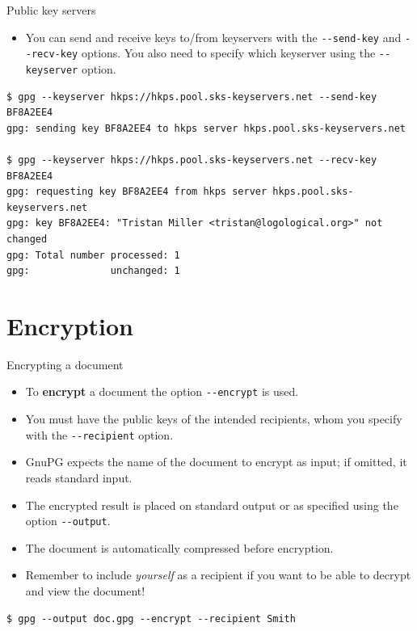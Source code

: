 \documentclass[
mode=present,
paper=smartboard,
size=20pt,
]{powerdot}
\newcommand\vsp{\vspace{-16mm}}
\newcommand{\clopt}[1]{\texttt{{-}#1}}
\begin{document}
\makeatletter\renewcommand{\verbatim@font}{\footnotesize\tt}\makeatother
\begin{slide}[method=direct,toc=]{Public key servers}
  \begin{itemize}
  \item You can send and receive keys to/from keyservers with the
    \clopt{-send-key} and \clopt{-recv-key} options.  You also need to
    specify which keyserver using the \clopt{-keyserver} option.
  \end{itemize}
\begin{verbatim}
$ gpg --keyserver hkps://hkps.pool.sks-keyservers.net --send-key BF8A2EE4
gpg: sending key BF8A2EE4 to hkps server hkps.pool.sks-keyservers.net

$ gpg --keyserver hkps://hkps.pool.sks-keyservers.net --recv-key BF8A2EE4
gpg: requesting key BF8A2EE4 from hkps server hkps.pool.sks-keyservers.net
gpg: key BF8A2EE4: "Tristan Miller <tristan@logological.org>" not changed
gpg: Total number processed: 1
gpg:              unchanged: 1
\end{verbatim}
\end{slide}

\section{Encryption}

\begin{slide}[method=direct]{Encrypting a document}
  \begin{itemize}
  \item To \textbf{encrypt} a document the option \clopt{-encrypt} is
    used.
  \item You must have the public keys of the intended recipients, whom
    you specify with the \clopt{-recipient} option.
  \item GnuPG expects the name of the document to encrypt as input; if
    omitted, it reads standard input.
  \item The encrypted result is placed on standard output or as
    specified using the option \clopt{-output}.
  \item The document is automatically compressed before encryption.
  \item Remember to include \emph{yourself} as a recipient if you want
    to be able to decrypt and view the document!
  \end{itemize}
\vsp
\begin{verbatim}
$ gpg --output doc.gpg --encrypt --recipient Smith
\end{verbatim}
\end{slide}
\end{document}
